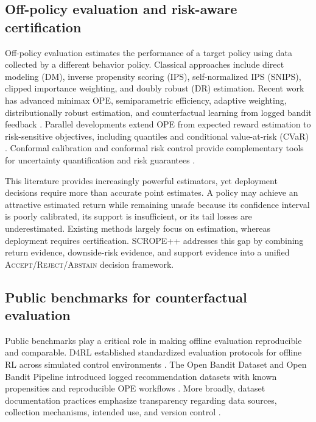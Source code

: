 \documentclass[conference]{IEEEtran}
\begin{document}
\subsection{Off-policy evaluation and risk-aware certification}

Off-policy evaluation estimates the performance of a target policy using data collected by a different behavior policy. Classical approaches include direct modeling (DM), inverse propensity scoring (IPS), self-normalized IPS (SNIPS), clipped importance weighting, and doubly robust (DR) estimation. Recent work has advanced minimax OPE, semiparametric efficiency, adaptive weighting, distributionally robust estimation, and counterfactual learning from logged bandit feedback \cite{SwaminathanJ15,DuanJW20,KallusU20,KallusMWZ22,ZhanHHA21,XieYZ23}. Parallel developments extend OPE from expected reward estimation to risk-sensitive objectives, including quantiles and conditional value-at-risk (CVaR) \cite{ChandakNLBT21,HuangLLA21,TaufiqTCTD22}. Conformal calibration and conformal risk control provide complementary tools for uncertainty quantification and risk guarantees \cite{AngelopoulosBFLS24}.

This literature provides increasingly powerful estimators, yet deployment decisions require more than accurate point estimates. A policy may achieve an attractive estimated return while remaining unsafe because its confidence interval is poorly calibrated, its support is insufficient, or its tail losses are underestimated. Existing methods largely focus on estimation, whereas deployment requires certification. SCROPE++ addresses this gap by combining return evidence, downside-risk evidence, and support evidence into a unified \textsc{Accept}/\textsc{Reject}/\textsc{Abstain} decision framework.

\subsection{Public benchmarks for counterfactual evaluation}

Public benchmarks play a critical role in making offline evaluation reproducible and comparable. D4RL established standardized evaluation protocols for offline RL across simulated control environments \cite{FuKNTL20}. The Open Bandit Dataset and Open Bandit Pipeline introduced logged recommendation datasets with known propensities and reproducible OPE workflows \cite{SaitoAMN21}. More broadly, dataset documentation practices emphasize transparency regarding data sources, collection mechanisms, intended use, and version control \cite{GebruMVWDL21}.
\end{document}
